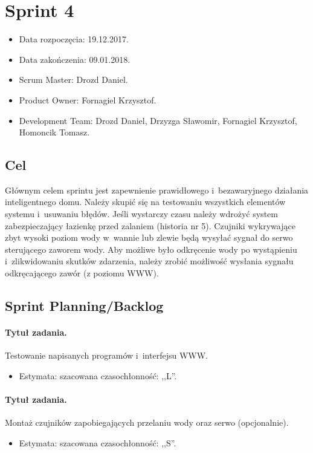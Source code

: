 \section{Sprint 4}
\begin{itemize}
	\item Data rozpoczęcia: 19.12.2017.
	\item Data zakończenia: 09.01.2018.
	\item Scrum Master: Drozd Daniel.
	\item Product Owner: Fornagiel Krzysztof.
	\item Development Team: Drozd Daniel, Drzyzga Sławomir, Fornagiel Krzysztof, Homoncik Tomasz.
\end{itemize}
\subsection{Cel} 

Głównym celem sprintu jest zapewnienie prawidłowego i~bezawaryjnego działania inteligentnego domu. Należy skupić się na testowaniu wszystkich elementów systemu i~usuwaniu błędów. Jeśli wystarczy czasu należy wdrożyć system zabezpieczający łazienkę przed zalaniem (historia nr 5). Czujniki wykrywające zbyt wysoki poziom wody w~wannie lub zlewie będą wysyłać sygnał do serwo sterującego zaworem wody. Aby możliwe było odkręcenie wody po wystąpieniu i~zlikwidowaniu skutków zdarzenia, należy zrobić możliwość wysłania sygnału odkręcającego zawór (z poziomu WWW).


\subsection{Sprint Planning/Backlog}

\paragraph{Tytuł zadania.} Testowanie napisanych programów i~interfejsu WWW.
\begin{itemize}
	\item Estymata: szacowana czasochłonność: ,,L''.
\end{itemize}

\paragraph{Tytuł zadania.} Montaż czujników zapobiegających przelaniu wody oraz serwo (opcjonalnie).
\begin{itemize}
	\item Estymata: szacowana czasochłonność: ,,S''.
\end{itemize}

